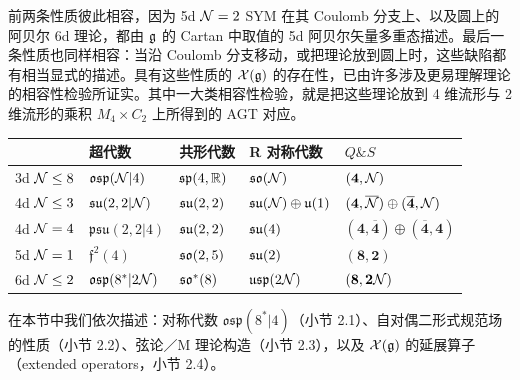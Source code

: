 前两条性质彼此相容，因为 5d $\mathcal{N}=2$ SYM 在其 Coulomb 分支上、以及圆上的阿贝尔 6d 理论，都由 $\mathfrak{g}$ 的 Cartan 中取值的 5d 阿贝尔矢量多重态描述。最后一条性质也同样相容：当沿 Coulomb 分支移动，或把理论放到圆上时，这些缺陷都有相当显式的描述。具有这些性质的 $\mathcal{X}(\mathfrak{g})$ 的存在性，已由许多涉及更易理解理论的相容性检验所证实。其中一大类相容性检验，就是把这些理论放到 4 维流形与 2 维流形的乘积 $M_4\times C_2$ 上所得到的 AGT 对应。

\begin{table}[htbp]
\centering
\small
\begin{tabular}{lllll}
\toprule
 & 超代数 & 共形代数 & R 对称代数 & $Q\&S$ \\
\midrule
3d $\mathcal{N}\le 8$ & $\mathfrak{osp}(\mathcal{N}|4)$ & $\mathfrak{sp}(4,\mathbb{R})$ & $\mathfrak{so}(\mathcal{N})$ & $(\mathbf{4},\mathcal{N})$ \\
4d $\mathcal{N}\le 3$ & $\mathfrak{su}(2,2|\mathcal{N})$ & $\mathfrak{su}(2,2)$ & $\mathfrak{su}(\mathcal{N})\oplus\mathfrak{u}(1)$ & $(\mathbf{4},\overline{\mathcal{N}})\oplus(\overline{\mathbf{4}},\mathcal{N})$ \\
4d $\mathcal{N}=4$ & $\mathfrak{psu}(2,2|4)$ & $\mathfrak{su}(2,2)$ & $\mathfrak{su}(4)$ & $(\mathbf{4},\overline{\mathbf{4}})\oplus(\overline{\mathbf{4}},\mathbf{4})$ \\
5d $\mathcal{N}=1$ & $\mathfrak{f}^2(4)$ & $\mathfrak{so}(2,5)$ & $\mathfrak{su}(2)$ & $(\mathbf{8},\mathbf{2})$ \\
6d $\mathcal{N}\le 2$ & $\mathfrak{osp}(8^*|2\mathcal{N})$ & $\mathfrak{so}^*(8)$ & $\mathfrak{usp}(2\mathcal{N})$ & $(\mathbf{8},\mathbf{2}\mathcal{N})$ \\
\bottomrule
\end{tabular}
\end{table}


在本节中我们依次描述：对称代数 $\mathfrak{osp}(8^*|4)$（小节 2.1）、自对偶二形式规范场的性质（小节 2.2）、弦论／M 理论构造（小节 2.3），以及 $\mathcal{X}(\mathfrak{g})$ 的延展算子（extended operators，小节 2.4）。

